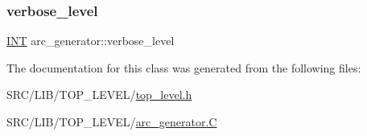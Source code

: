 \mbox{\label{classarc__generator_a38cb55f50fe5c7965368f1ff8ea8b017}} 
\subsubsection{\texorpdfstring{verbose\+\_\+level}{verbose\_level}}
{\footnotesize\ttfamily \mbox{\hyperlink{galois_8h_a09fddde158a3a20bd2dcadb609de11dc}{I\+NT}} arc\+\_\+generator\+::verbose\+\_\+level}



The documentation for this class was generated from the following files\+:\begin{DoxyCompactItemize}
\item 
S\+R\+C/\+L\+I\+B/\+T\+O\+P\+\_\+\+L\+E\+V\+E\+L/\mbox{\hyperlink{top__level_8h}{top\+\_\+level.\+h}}\item 
S\+R\+C/\+L\+I\+B/\+T\+O\+P\+\_\+\+L\+E\+V\+E\+L/\mbox{\hyperlink{arc__generator_8_c}{arc\+\_\+generator.\+C}}\end{DoxyCompactItemize}
